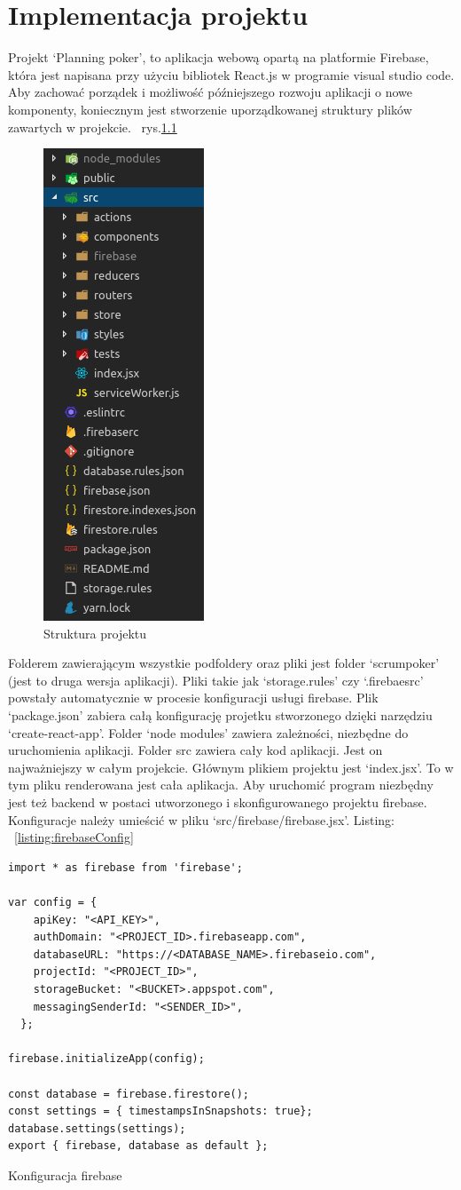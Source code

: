 \chapter{Implementacja projektu}

Projekt `Planning poker', to aplikacja webową opartą na platformie Firebase,
która jest napisana przy użyciu bibliotek React.js w programie visual studio code.
Aby zachować porządek i możliwość późniejszego rozwoju aplikacji o nowe komponenty,
koniecznym jest stworzenie uporządkowanej struktury plików zawartych w projekcie.
~rys.\ref{rys:projekt}
\begin{figure}
	\centering\includegraphics[width=.2\textwidth]{img/projekt}
	\caption{Struktura projektu}\label{rys:projekt}%
\end{figure}
Folderem zawierającym wszystkie podfoldery oraz pliki jest folder `scrumpoker' (jest to druga wersja aplikacji).
Pliki takie jak `storage.rules' czy `.firebaesrc' powstały automatycznie w procesie konfiguracji usługi firebase.
Plik `package.json' zabiera całą konfigurację projetku stworzonego dzięki narzędziu `create-react-app'.
Folder `node modules' zawiera zależności, niezbędne do uruchomienia aplikacji.
    Folder src zawiera cały kod aplikacji. Jest on najważniejszy w całym projekcie.
Głównym plikiem projektu jest `index.jsx'. To w tym pliku renderowana jest cała aplikacja.
Aby uruchomić program niezbędny jest też backend w postaci utworzonego i skonfigurowanego projektu firebase.
Konfiguracje należy umieścić w pliku `src/firebase/firebase.jsx'. Listing:
~\ref{listing:firebaseConfig} 

\begin{listing}
	\begin{verbatim}
import * as firebase from 'firebase';

var config = {
    apiKey: "<API_KEY>",
    authDomain: "<PROJECT_ID>.firebaseapp.com",
    databaseURL: "https://<DATABASE_NAME>.firebaseio.com",
    projectId: "<PROJECT_ID>",
    storageBucket: "<BUCKET>.appspot.com",
    messagingSenderId: "<SENDER_ID>",
  };

firebase.initializeApp(config);

const database = firebase.firestore();
const settings = { timestampsInSnapshots: true};
database.settings(settings);
export { firebase, database as default };
	\end{verbatim}
	\caption{Konfiguracja firebase} \label{listing:firebaseConfig}
\end{listing}

